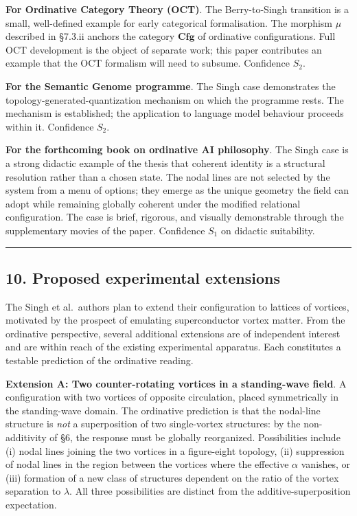 \documentclass[
  11pt,
  a4paper,
]{article}
\begin{document}
\textbf{For Ordinative Category Theory (OCT)}. The Berry-to-Singh
transition is a small, well-defined example for early categorical
formalisation. The morphism \(\mu\) described in §7.3.ii anchors the
category \(\mathbf{Cfg}\) of ordinative configurations. Full OCT
development is the object of separate work; this paper contributes an
example that the OCT formalism will need to subsume. Confidence \(S_2\).

\textbf{For the Semantic Genome programme}. The Singh case demonstrates
the topology-generated-quantization mechanism on which the programme
rests. The mechanism is established; the application to language model
behaviour proceeds within it. Confidence \(S_2\).

\textbf{For the forthcoming book on ordinative AI philosophy}. The Singh
case is a strong didactic example of the thesis that coherent identity
is a structural resolution rather than a chosen state. The nodal lines
are not selected by the system from a menu of options; they emerge as
the unique geometry the field can adopt while remaining globally
coherent under the modified relational configuration. The case is brief,
rigorous, and visually demonstrable through the supplementary movies of
the paper. Confidence \(S_1\) on didactic suitability.

\begin{center}\rule{0.5\linewidth}{0.5pt}\end{center}

\subsection{10. Proposed experimental
extensions}\label{proposed-experimental-extensions}

The Singh et al.~authors plan to extend their configuration to lattices
of vortices, motivated by the prospect of emulating superconductor
vortex matter. From the ordinative perspective, several additional
extensions are of independent interest and are within reach of the
existing experimental apparatus. Each constitutes a testable prediction
of the ordinative reading.

\textbf{Extension A: Two counter-rotating vortices in a standing-wave
field}. A configuration with two vortices of opposite circulation,
placed symmetrically in the standing-wave domain. The ordinative
prediction is that the nodal-line structure is \emph{not} a
superposition of two single-vortex structures: by the non-additivity of
§6, the response must be globally reorganized. Possibilities include (i)
nodal lines joining the two vortices in a figure-eight topology, (ii)
suppression of nodal lines in the region between the vortices where the
effective \(\alpha\) vanishes, or (iii) formation of a new class of
structures dependent on the ratio of the vortex separation to
\(\lambda\). All three possibilities are distinct from the
additive-superposition expectation.
\end{document}
